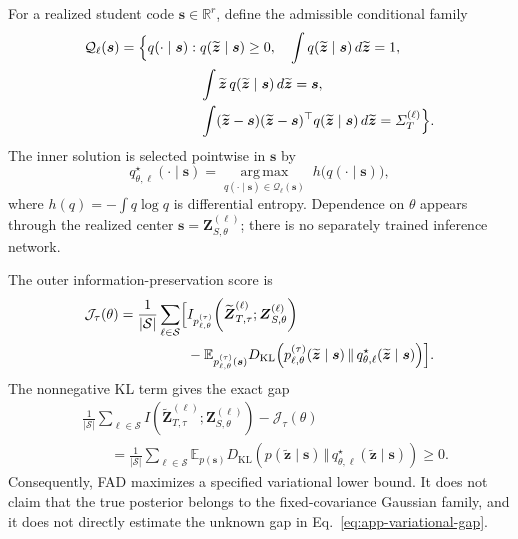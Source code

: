 \documentclass{article}
\newcommand{\E}{\mathbb{E}}
\newcommand{\R}{\mathbb{R}}
\newcommand{\calS}{\mathcal{S}}
\newcommand{\calQ}{\mathcal{Q}}
\newcommand{\KL}{\mathrm{KL}}
\newcommand{\bs}{\boldsymbol{s}}
\newcommand{\bz}{\boldsymbol{z}}
\newcommand{\bSigma}{\varSigma}
\theoremstyle{plain}
\theoremstyle{definition}
\theoremstyle{remark}
\begin{document}
For a realized student code $\bs\in\R^r$, define the admissible conditional
family
\begin{equation}
\begin{aligned}
  \calQ_{\ell}(\bs)=\Bigl\{q(\cdot\mid\bs):\;&q(\widetilde{\bz}\mid\bs)\ge0,
  \quad \int q(\widetilde{\bz}\mid\bs)\,d\widetilde{\bz}=1,\\
  &\int \widetilde{\bz}\,q(\widetilde{\bz}\mid\bs)\,d\widetilde{\bz}=\bs,\\
  &\int (\widetilde{\bz}-\bs)(\widetilde{\bz}-\bs)^\top
  q(\widetilde{\bz}\mid\bs)\,d\widetilde{\bz}=\bSigma_T^{(\ell)}\Bigr\}.
  \label{eq:app-conditional-family}
\end{aligned}
\end{equation}
The inner solution is selected pointwise in $\bs$ by
\begin{equation}
  q_{\theta,\ell}^{\star}(\cdot\mid\bs)
  =\underset{q(\cdot\mid\bs)\in\calQ_{\ell}(\bs)}
  {\operatorname{arg\,max}}
  \;h\bigl(q(\cdot\mid\bs)\bigr),
  \label{eq:app-pointwise-maxent}
\end{equation}
where $h(q)=-\int q\log q$ is differential entropy.  Dependence on $\theta$
appears through the realized center
$\bs=\boldsymbol{Z}_{S,\theta}^{(\ell)}$; there is no separately trained
inference network.

The outer information-preservation score is
\begin{equation}
\begin{aligned}
  \mathcal J_{\tau}(\theta)
  =\frac{1}{|\calS|}\sum_{\ell\in\calS}\Bigl[&
  I_{p_{\ell,\theta}^{(\tau)}}\!\left(
  \widetilde{\boldsymbol{Z}}_{T,\tau}^{(\ell)};
  \boldsymbol{Z}_{S,\theta}^{(\ell)}\right)\\
  &-\E_{p_{\ell,\theta}^{(\tau)}(\bs)}
  D_{\KL}\!\left(
  p_{\ell,\theta}^{(\tau)}(\widetilde{\bz}\mid\bs)
  \,\Vert\,
  q_{\theta,\ell}^{\star}(\widetilde{\bz}\mid\bs)
  \right)\Bigr].
  \label{eq:app-complete-bilevel}
\end{aligned}
\end{equation}
The nonnegative KL term gives the exact gap
\begin{equation}
\begin{aligned}
  &\frac{1}{|\calS|}\sum_{\ell\in\calS}
  I\!\left(\widetilde{\boldsymbol{Z}}_{T,\tau}^{(\ell)};
  \boldsymbol{Z}_{S,\theta}^{(\ell)}\right)
  -\mathcal J_{\tau}(\theta)\\
  &\qquad=\frac{1}{|\calS|}\sum_{\ell\in\calS}
  \E_{p(\bs)}D_{\KL}\!\left(p(\widetilde{\bz}\mid\bs)
  \,\Vert\,q_{\theta,\ell}^{\star}(\widetilde{\bz}\mid\bs)\right)\ge0.
  \label{eq:app-variational-gap}
\end{aligned}
\end{equation}
Consequently, FAD maximizes a specified variational lower bound.  It does not
claim that the true posterior belongs to the fixed-covariance Gaussian family,
and it does not directly estimate the unknown gap in
Eq.~\eqref{eq:app-variational-gap}.
\end{document}
